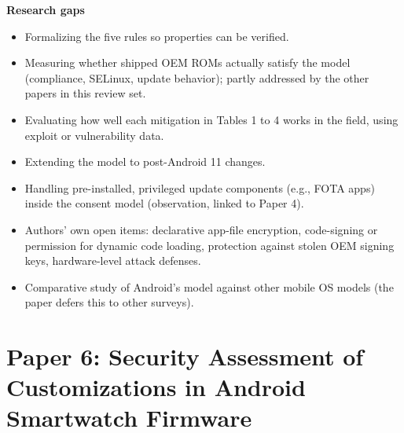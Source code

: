 \documentclass[11pt,a4paper]{article}
\begin{document}
\begin{enumerate}
    \vspace{4pt}
    \textbf{Research gaps}
    \begin{itemize}[leftmargin=*,itemsep=1pt,topsep=2pt]
        \item Formalizing the five rules so properties can be verified.
        \item Measuring whether shipped OEM ROMs actually satisfy the model (compliance, SELinux, update behavior); partly addressed by the other papers in this review set.
        \item Evaluating how well each mitigation in Tables 1 to 4 works in the field, using exploit or vulnerability data.
        \item Extending the model to post-Android 11 changes.
        \item Handling pre-installed, privileged update components (e.g., FOTA apps) inside the consent model (observation, linked to Paper 4).
        \item Authors' own open items: declarative app-file encryption, code-signing or permission for dynamic code loading, protection against stolen OEM signing keys, hardware-level attack defenses.
        \item Comparative study of Android's model against other mobile OS models (the paper defers this to other surveys).
    \end{itemize}

\end{enumerate}

\newpage

\section{Paper 6: Security Assessment of Customizations in Android Smartwatch Firmware}
\end{document}
